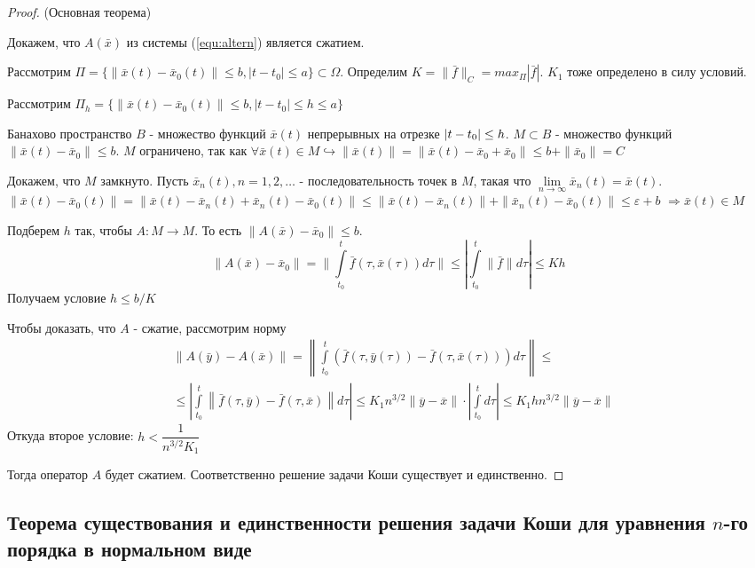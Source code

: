 \begin{proof}
	(Основная теорема)
	
	Докажем, что $A(\bar{x})$ из системы (\ref{equ:altern}) является сжатием.
	
	Рассмотрим $\Pi = \{\|\bar{x}(t) - \bar{x}_0(t)\| \le b, |t-t_0| \le a   \} \subset \Omega$. Определим $K = \|\bar{f}\|_C = max_{\Pi}|\bar{f}|$. $K_1$ тоже определено в силу условий.
	
	Рассмотрим $\Pi_h = \{\|\bar{x}(t) - \bar{x}_0(t)\| \le b, |t-t_0| \le h \le a   \}$
	
	Банахово пространство $B$ - множество функций $\bar{x}(t)$ непрерывных на отрезке $|t-t_0|\hm\le h$. $M \subset B$ - множество функций $\|\bar{x}(t) - \bar{x}_0\| \le b$. $M$ ограничено, так как $\forall \bar{x}(t) \in M \hookrightarrow \|\bar{x}(t)\| = \|\bar{x}(t) - \bar{x}_0 + \bar{x}_0\| \le b + \|\bar{x}_0\| = C$
	
	Докажем, что $M$ замкнуто. Пусть $\bar{x}_n(t), n = 1, 2, \dots$ - последовательность точек в $M$, такая что $\lim\limits_{n\to \infty} \bar{x}_n(t) = \bar{x}(t)$. $\|\bar{x}(t) - \bar{x}_0(t)\| = \|\bar{x}(t) - \bar{x}_n(t) + \bar{x}_n(t) - \bar{x}_0(t)\| \le \|\bar{x}(t) - \bar{x}_n(t)\| + \|\bar{x}_n(t) - \bar{x}_0(t)\| \le \varepsilon + b$ $\Rightarrow \bar{x}(t) \in M$
	
	Подберем $h$ так, чтобы $A:M\to M$. То есть $\|A(\bar{x}) - \bar{x}_0\| \le b$.
	\[
		\|A(\bar{x}) - \bar{x}_0\| = \|\int\limits_{t_0}^t \bar{f}(\tau, \bar{x}(\tau))d\tau\| \le |\int\limits_{t_0}^t \|\bar{f}\|d\tau| \le Kh
	\]
	Получаем условие $h\le b/K$
	
	Чтобы доказать, что $A$ - сжатие, рассмотрим норму
	\begin{align*}
		&\|A(\bar{y}) - A(\bar{x})\| = \left\|
		\int\limits_{t_0}^t(\bar{f}(\tau, \bar{y}(\tau)) - \bar{f}(\tau, \bar{x}(\tau)))d\tau \right\| \le \\ &\le  \left| \int\limits_{t_0}^t \left\| \bar{f}(\tau, \bar{y}) - \bar{f}(\tau, \bar{x}) \right\| d\tau\right| \le K_1n^{3/2}\|\overline{y} - \overline{x}\|\cdot \left|\int\limits_{t_0}^td\tau\right| \le K_1hn^{3/2}\|\overline{y} - \overline{x}\|
	\end{align*}
	Откуда второе условие: $h < \dfrac{1}{n^{3/2}K_1}$
	
	Тогда оператор $A$ будет сжатием. Соответственно решение задачи Коши существует и единственно.
	
\end{proof}

\subsection{Теорема существования и единственности решения задачи Коши для уравнения $n$-го порядка в нормальном виде}

